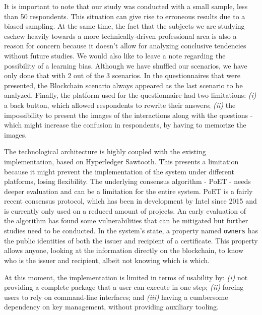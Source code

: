 It is important to note that our study was conducted with a small sample, less than 50 respondents. This situation can give rise to erroneous results due to a biased sampling. At the same time, the fact that the subjects we are studying eschew heavily towards a more technically-driven professional area is also a reason for concern because it doesn't allow for analyzing conclusive tendencies without future studies. We would also like to leave a note regarding the possibility of a learning bias. Although we have shuffled our scenarios, we have only done that with 2 out of the 3 scenarios. In the questionnaires that were presented, the Blockchain scenario always appeared as the last scenario to be analyzed. Finally, the platform used for the questionnaire had two limitations: \textit{(i)} a back button, which allowed respondents to rewrite their answers; \textit{(ii)} the impossibility to present the images of the interactions along with the questions - which might increase the confusion in respondents, by having to memorize the images.

The technological architecture is highly coupled with the existing implementation, based on Hyperledger Sawtooth. This presents a limitation because it might prevent the implementation of the system under different platforms, losing flexibility. The underlying consensus algorithm - PoET - needs deeper evaluation and can be a limitation for the entire system. PoET is a fairly recent consensus protocol, which has been in development by Intel since 2015 and is currently only used on a reduced amount of projects. An early evaluation of the algorithm has found some vulnerabilities that can be mitigated \cite{chen_security_2017} but further studies need to be conducted. In the system's state, a property named \texttt{owners} has the public identities of both the issuer and recipient of a certificate. This property allows anyone, looking at the information directly on the blockchain, to know who is the issuer and recipient, albeit not knowing which is which.

At this moment, the implementation is limited in terms of usability by: \emph{(i)} not providing a complete package that a user can execute in one step; \emph{(ii)} forcing users to rely on command-line interfaces; and \emph{(iii)} having a cumbersome dependency on key management, without providing auxiliary tooling.